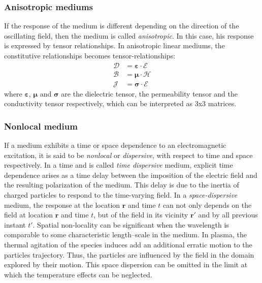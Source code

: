 \subsubsection{Anisotropic mediums}
If the response of the medium is different depending on the direction of the oscillating field, then the medium is called \emph{anisotropic}. In this case, his response is expressed by tensor relationships.   In anisotropic linear mediums, the constitutive relationships becomes tensor-relationships:
\begin{subequations}
 \begin{align}
  \boldsymbol{\mathcal{D}} &= \boldsymbol{\varepsilon} \cdot \boldsymbol{\mathcal{E}} \\
  \boldsymbol{\mathcal{B}} &= \boldsymbol{\mu} \cdot  \boldsymbol{\mathcal{H}} \\
  \boldsymbol{\mathcal{J}} &= \boldsymbol{\sigma} \cdot  \boldsymbol{\mathcal{E}}
 \end{align}
\end{subequations}
where $\boldsymbol{\varepsilon}$, $\boldsymbol{\mu}$ and $\boldsymbol{\sigma}$ are the dielectric tensor, the permeability tensor and the conductivity tensor respectively, which can be interpreted as 3x3 matrices\parencite{Swanson2003}.  

\subsubsection{Nonlocal medium}
If a medium exhibits a time or space dependence to an electromagnetic excitation, it is said to be \emph{nonlocal} or \emph{dispersive}, with respect to time and space respectively. In a time and is called \emph{time dispersive} medium, explicit time dependence arises as a time delay between the imposition of the electric field and the resulting polarization of the medium. This delay is due to the inertia of charged particles to respond to the time-varying field\parencite{Mackay2010, Brambilla1998}. In a \emph{space-dispersive} medium, the response at the location $\mathbf{r}$ and time $t$ can not only depends on the field at location $\mathbf{r}$ and time $t$, but of the field in its vicinity $\mathbf{r}'$ and by all previous instant $t'$. Spatial non-locality can be significant when the wavelength is comparable to some characteristic length–scale in the medium.  In plasma, the thermal agitation of the species induces add an additional erratic motion to the particles trajectory. Thus, the particles are influenced by the field in the domain explored by their motion\parencite{Brambilla1998}. This space dispersion can be omitted in the limit at which the temperature effects can be neglected. 

